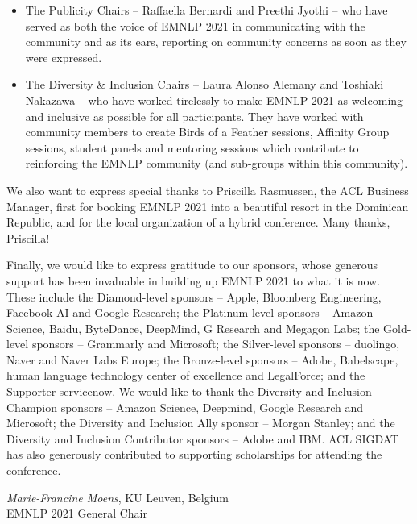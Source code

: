 \begin{itemize}
\item The Publicity Chairs -- Raffaella Bernardi and Preethi Jyothi -- who have served as both the voice of EMNLP 2021 in communicating with the community and as its ears, reporting on community concerns as soon as they were expressed.
\item The Diversity & Inclusion Chairs -- Laura Alonso Alemany and Toshiaki Nakazawa -- who have worked tirelessly to make EMNLP 2021 as welcoming and inclusive as possible for all participants. They have worked with community members to create Birds of a Feather sessions, Affinity Group sessions, student panels and mentoring sessions which contribute to reinforcing the EMNLP community (and sub-groups within this community).
\end{itemize}

We also want to express special thanks to Priscilla Rasmussen, the ACL Business Manager, first for booking EMNLP 2021 into a beautiful resort in the Dominican Republic, and for the local organization of a hybrid conference. Many thanks, Priscilla!

Finally, we would like to express gratitude to our sponsors, whose generous support has been invaluable in building up EMNLP 2021 to what it is now. These include the Diamond-level sponsors -- Apple, Bloomberg Engineering, Facebook AI and Google Research; the Platinum-level sponsors -- Amazon Science, Baidu, ByteDance, DeepMind, G Research and Megagon Labs; the Gold-level sponsors -- Grammarly and Microsoft; the Silver-level sponsors -- duolingo, Naver and Naver Labs Europe; the Bronze-level sponsors -- Adobe, Babelscape, human language technology center of excellence and LegalForce; and the Supporter servicenow. We would like to thank the Diversity and Inclusion Champion sponsors -- Amazon Science, Deepmind, Google Research and Microsoft; the Diversity and Inclusion Ally sponsor -- Morgan Stanley; and the Diversity and Inclusion Contributor sponsors -- Adobe and IBM. ACL SIGDAT has also generously contributed to supporting scholarships for attending the conference.

\vspace{3em}

\noindent \textit{Marie-Francine Moens}, KU Leuven, Belgium \\
\noindent EMNLP 2021 General Chair \\

